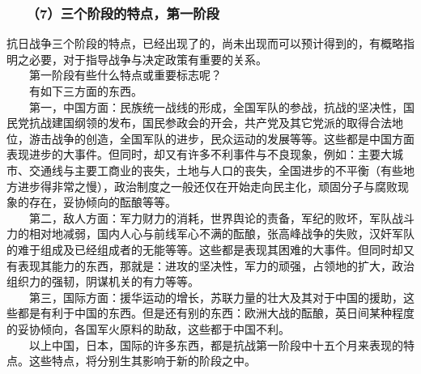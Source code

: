 \documentclass[cn,11pt,chinese]{elegantbook}
\def\myformat#1{\hfil\hfil #1}
\begin{document}
\subsubsection*{\myformat{　　（7）三个阶段的特点，第一阶段}}
抗日战争三个阶段的特点，已经出现了的，尚未出现而可以预计得到的，有概略指明之必要，对于指导战争与决定政策有重要的关系。\\
　　第一阶段有些什么特点或重要标志呢？\\
　　有如下三方面的东西。\\
　　第一，中国方面：民族统一战线的形成，全国军队的参战，抗战的坚决性，国民党抗战建国纲领的发布，国民参政会的开会，共产党及其它党派的取得合法地位，游击战争的创造，全国军队的进步，民众运动的发展等等。这些都是中国方面表现进步的大事件。但同时，却又有许多不利事件与不良现象，例如：主要大城市、交通线与主要工商业的丧失，土地与人口的丧失，全国进步的不平衡（有些地方进步得非常之慢），政治制度之一般还仅在开始走向民主化，顽固分子与腐败现象的存在，妥协倾向的酝酿等等。\\
　　第二，敌人方面：军力财力的消耗，世界舆论的责备，军纪的败坏，军队战斗力的相对地减弱，国内人心与前线军心不满的酝酿，张高峰战争的失败，汉奸军队的难于组成及已经组成者的无能等等。这些都是表现其困难的大事件。但同时却又有表现其能力的东西，那就是：进攻的坚决性，军力的顽强，占领地的扩大，政治组织力的强韧，阴谋机关的有力等等。\\
　　第三，国际方面：援华运动的增长，苏联力量的壮大及其对于中国的援助，这些都是有利于中国的东西。但是还有别的东西：欧洲大战的酝酿，英日间某种程度的妥协倾向，各国军火原料的助敌，这些都于中国不利。\\
　　以上中国，日本，国际的许多东西，都是抗战第一阶段中十五个月来表现的特点。这些特点，将分别生其影响于新的阶段之中。\\
\end{document}
